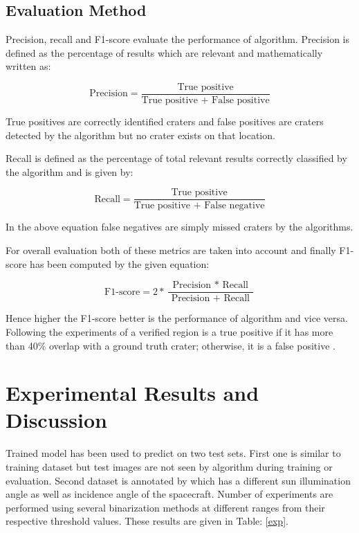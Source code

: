 \documentclass[11pt]{article}
\begin{document}
\subsection{Evaluation Method}
Precision, recall and F1-score evaluate the performance of algorithm. Precision is defined as the percentage of results which are relevant and mathematically written as:

\begin{equation*}
\text{Precision} = \frac{\text{True positive}}{\text{True positive + False positive}}
\end{equation*}

True positives are correctly identified craters and false positives are craters detected by the algorithm but no crater exists on that location.

Recall is defined as the percentage of total relevant results correctly classified by the algorithm and is given by:

\begin{equation*}
\text{Recall} = \frac{\text{True positive}}{\text{True positive + False negative}}
\end{equation*}

In the above equation false negatives are simply missed craters by the algorithms.

For overall evaluation both of these metrics are taken into account and finally F1-score has been computed by the given equation:

\begin{equation*}
\text{F1-score} =2 * \frac{\text { Precision } * \text { Recall }}{\text { Precision }+\text { Recall }}
\end{equation*}

Hence higher the F1-score better is the performance of algorithm and vice versa. Following the experiments of \cite{emami2015automatic} a verified region is a true positive if it has more than 40\% overlap with a ground truth crater; otherwise, it is a false positive .

\section{Experimental Results and Discussion}
Trained model has been used to predict on two test sets. First one is similar to training dataset but test images are not seen by algorithm during training or evaluation. Second dataset is annotated by \cite{dino2020} which has a different sun illumination angle as well as incidence angle of the spacecraft. Number of experiments are performed using several binarization methods at different ranges from their respective threshold values. These results are given in Table: \ref{exp}.
\end{document}
